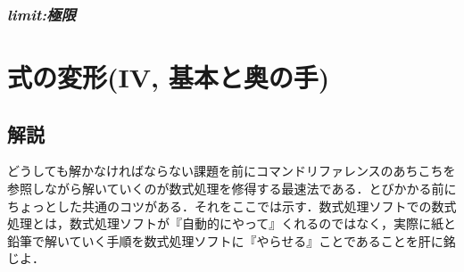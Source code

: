 \documentclass{article}
\begin{document}
\subsubsection{\textit{limit:極限}}
\begin{maplegroup}
\begin{mapleinput}
\end{mapleinput}
\mapleresult
\begin{maplelatex}
\end{maplelatex}
\end{maplegroup}
\begin{maplegroup}
\begin{mapleinput}
\end{mapleinput}
\mapleresult
\begin{maplelatex}
\end{maplelatex}
\end{maplegroup}
\begin{maplegroup}
\begin{mapleinput}
\end{mapleinput}
\mapleresult
\begin{maplelatex}
\end{maplelatex}
\mapleresult
\begin{maplelatex}
\end{maplelatex}
\end{maplegroup}
\begin{maplelatex}\begin{Maple Normal}{
}\end{Maple Normal}
\end{maplelatex}
\begin{maplegroup}
\newpage
\end{maplegroup}
\section{\textbf{式の変形(IV, 基本と奥の手)}}
\subsection{\textbf{解説}}
\begin{maplelatex}どうしても解かなければならない課題を前にコマンドリファレンスのあちこちを参照しながら解いていくのが数式処理を修得する最速法である．とびかかる前にちょっとした共通のコツがある．それをここでは示す．数式処理ソフトでの数式処理とは，数式処理ソフトが『自動的にやって』くれるのではなく，実際に紙と鉛筆で解いていく手順を数式処理ソフトに『やらせる』ことであることを肝に銘じよ．\end{maplelatex}
\end{document}

